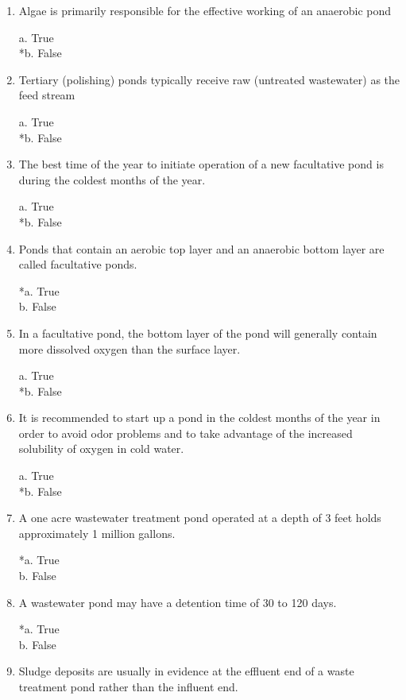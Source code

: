 \begin{enumerate}
\item  Algae is primarily responsible for the effective working of an anaerobic pond 

a. True \\
*b. False 


\item  Tertiary (polishing) ponds typically receive raw (untreated wastewater) as the feed stream 

a. True \\
*b. False \\

\item  The best time of the year to initiate operation of a new facultative pond is during the coldest months of the year. 

a. True \\
*b. False 


\item  Ponds that contain an aerobic top layer and an anaerobic bottom layer are called facultative ponds. 

*a. True \\
b. False 


\item  In a facultative pond, the bottom layer of the pond will generally contain more dissolved oxygen than the surface layer. 

a. True \\
*b. False 


\item  It is recommended to start up a pond in the coldest months of the year in order to avoid odor problems and to take advantage of the increased solubility of oxygen in cold water. 

a. True \\
*b. False 


\item  A one acre wastewater treatment pond operated at a depth of 3 feet holds approximately 1 million gallons. 

*a. True \\
b. False 


\item  A wastewater pond may have a detention time of 30 to 120 days. 

*a. True \\
b. False 


\item  Sludge deposits are usually in evidence at the effluent end of a waste treatment pond rather than the influent end. 


\end{enumerate}
